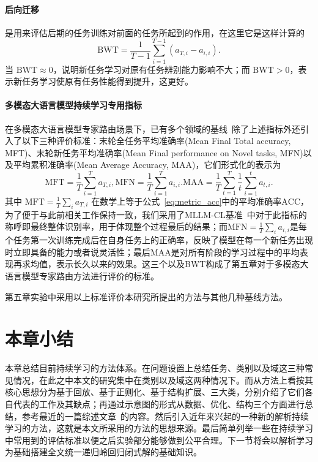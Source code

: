 \paragraph{后向迁移} 是用来评估后期的任务训练对前面的任务所起到的作用，在这里它是这样计算的
\begin{equation}
\mathrm{BWT}=\frac{1}{T-1}\sum_{i=1}^{T-1}(a_{T,i}-a_{i,i}).
\label{eq:metric_bwt}
\end{equation}
当 $\mathrm{BWT} \approx 0$，说明新任务学习对原有任务辨别能力影响不大；而 $\mathrm{BWT}>0$，表示新任务学习使原有任务性能得到提升，这更好。

\paragraph{多模态大语言模型持续学习专用指标} 在多模态大语言模型专家路由场景下，已有多个领域的基线~\citep{zhao2025mllm}除了上述指标外还引入了以下三种评价标准：末轮全任务平均准确率(Mean Final Total accuracy, MFT)、末轮新任务平均准确率(Mean Final performance on Novel tasks, MFN)以及平均累积准确率(Mean Average Accuracy, MAA)，它们形式化的表示为
\begin{equation}
\mathrm{MFT} = \frac{1}{T}\sum_{i=1}^T a_{T, i},
\mathrm{MFN}=\frac{1}{T}\sum_{i=1}^{T} a_{i,i}.
\mathrm{MAA}=\frac{1}{T}\sum_{t=1}^{T}\frac{1}{t}\sum_{i=1}^{t}a_{t,i}.
\label{eq:metric_mllm}
\end{equation}
其中 $\mathrm{MFT}=\frac{1}{T}\sum_ia_{T,i}$ 在数学上等于公式~\eqref{eq:metric_acc}中的平均准确率$\mathrm{ACC}$，为了便于与此前相关工作保持一致，我们采用了MLLM-CL基准~\citep{zhao2025mllm}中对于此指标的称呼即最终整体识别率，用于体现整个过程最后的结果；而$\mathrm{MFN}=\frac{1}{T}\sum_ia_{i,i}$是每个任务第一次训练完成后在自身任务上的正确率，反映了模型在每一个新任务出现时立即具备的能力或者说灵活性；最后MAA是对所有阶段的学习过程中的平均表现再求均值，表示长久以来的效果。这三个以及BWT构成了第五章对于多模态大语言模型专家路由方法进行评价的标准。

第五章实验中采用以上标准评价本研究所提出的方法与其他几种基线方法。

\section{本章小结}

本章总结目前持续学习的方法体系。在问题设置上总结任务、类别以及域这三种常见情况，在此之中本文的研究集中在类别以及域这两种情况下。而从方法上看按其核心思想分为基于回放、基于正则化、基于结构扩展、三大类，分别介绍了它们各自代表的工作及其缺点；再通过示意图的形式从数据、优化、结构三个方面进行总结，参考最近的一篇综述文章~\citep{wang2025llm_cl_zh}的内容。然后引入近年来兴起的一种新的解析持续学习的方法，这就是本文所采用的方法的思想来源。最后简单列举一些在持续学习中常用到的评估标准以便之后实验部分能够做到公平合理。下一节将会以解析学习为基础搭建全文统一递归岭回归闭式解的基础知识。